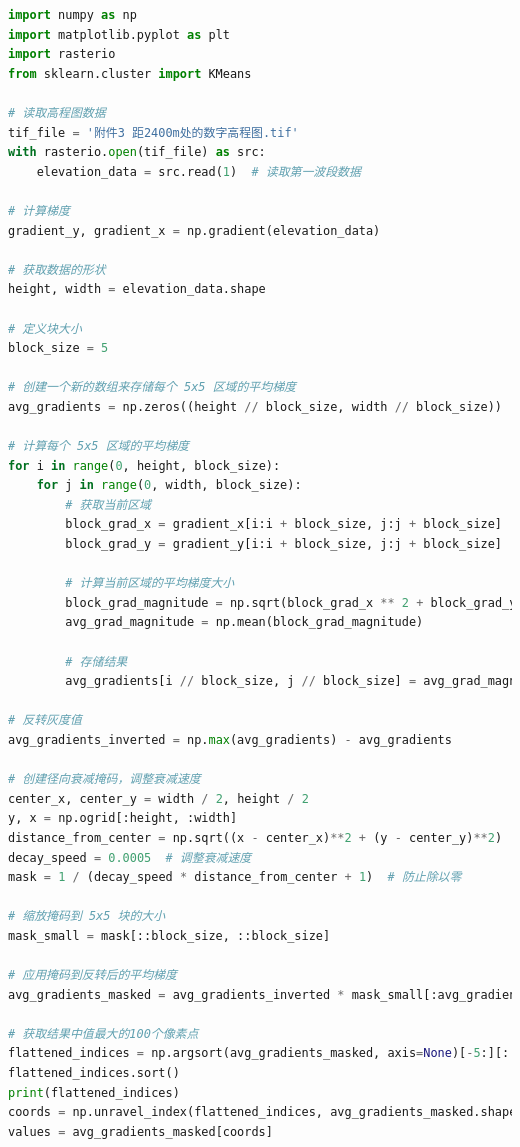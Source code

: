 \documentclass{ctexart}
\begin{document}
\begin{lstlisting}[language=Python, caption={寻找最优着陆点代码}, xleftmargin=0pt]
import numpy as np
import matplotlib.pyplot as plt
import rasterio
from sklearn.cluster import KMeans

# 读取高程图数据
tif_file = '附件3 距2400m处的数字高程图.tif'
with rasterio.open(tif_file) as src:
    elevation_data = src.read(1)  # 读取第一波段数据

# 计算梯度
gradient_y, gradient_x = np.gradient(elevation_data)

# 获取数据的形状
height, width = elevation_data.shape

# 定义块大小
block_size = 5

# 创建一个新的数组来存储每个 5x5 区域的平均梯度
avg_gradients = np.zeros((height // block_size, width // block_size))

# 计算每个 5x5 区域的平均梯度
for i in range(0, height, block_size):
    for j in range(0, width, block_size):
        # 获取当前区域
        block_grad_x = gradient_x[i:i + block_size, j:j + block_size]
        block_grad_y = gradient_y[i:i + block_size, j:j + block_size]

        # 计算当前区域的平均梯度大小
        block_grad_magnitude = np.sqrt(block_grad_x ** 2 + block_grad_y ** 2)
        avg_grad_magnitude = np.mean(block_grad_magnitude)

        # 存储结果
        avg_gradients[i // block_size, j // block_size] = avg_grad_magnitude

# 反转灰度值
avg_gradients_inverted = np.max(avg_gradients) - avg_gradients

# 创建径向衰减掩码，调整衰减速度
center_x, center_y = width / 2, height / 2
y, x = np.ogrid[:height, :width]
distance_from_center = np.sqrt((x - center_x)**2 + (y - center_y)**2)
decay_speed = 0.0005  # 调整衰减速度
mask = 1 / (decay_speed * distance_from_center + 1)  # 防止除以零

# 缩放掩码到 5x5 块的大小
mask_small = mask[::block_size, ::block_size]

# 应用掩码到反转后的平均梯度
avg_gradients_masked = avg_gradients_inverted * mask_small[:avg_gradients.shape[0], :avg_gradients.shape[1]]

# 获取结果中值最大的100个像素点
flattened_indices = np.argsort(avg_gradients_masked, axis=None)[-5:][::-1]
flattened_indices.sort()
print(flattened_indices)
coords = np.unravel_index(flattened_indices, avg_gradients_masked.shape)
values = avg_gradients_masked[coords]


\end{lstlisting}
\end{document}
